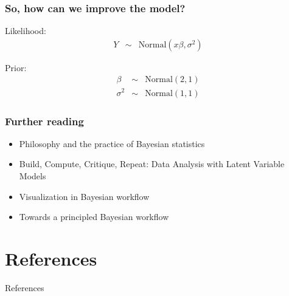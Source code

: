 \documentclass[xcolor=table]{beamer}
\begin{document}
\begin{frame}
  \frametitle{So, how can we improve the model?}

  Likelihood:
  \begin{eqnarray*}
    Y & \sim & \mathrm{Normal}(x \beta, \sigma^2)
  \end{eqnarray*}

  Prior:
  \begin{eqnarray*}
    \beta & \sim & \mathrm{Normal}(2, 1) \\
    \sigma^2 & \sim & \mathrm{Normal}(1, 1)
  \end{eqnarray*}

\end{frame}

\begin{frame}
  \frametitle{Further reading}

  \begin{itemize}
    \item Philosophy and the practice of Bayesian statistics \cite{Gelman:2013b}
    \item Build, Compute, Critique, Repeat: Data Analysis with Latent Variable Models \cite{Blei:2014}
    \item Visualization in Bayesian workflow \cite{Gabry:2017}
    \item Towards a principled Bayesian workflow \cite{Betancourt:2018}
  \end{itemize}

\end{frame}


\section{References}
\begin{frame}[allowframebreaks]{References}
\scriptsize
% 
%

  
\end{frame}
\end{document}
